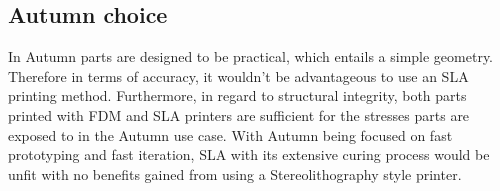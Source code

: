 \subsection{Autumn choice}

In Autumn parts are designed to be practical, which entails a simple geometry. Therefore in terms of accuracy, it wouldn't be advantageous to use an SLA printing method. Furthermore, in regard to structural integrity, both parts printed with FDM and SLA printers are sufficient for the stresses parts are exposed to in the Autumn use case. With Autumn being focused on fast prototyping and fast iteration, SLA with its extensive curing process would be unfit with no benefits gained from using a Stereolithography style printer. 

